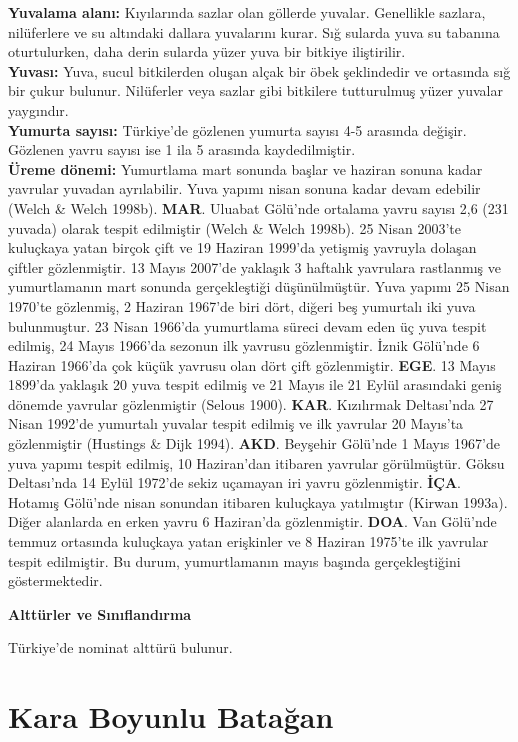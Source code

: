 \documentclass[
  letterpaper,
  DIV=11,
  numbers=noendperiod]{scrreprt}
\begin{document}
\textbf{Yuvalama alanı:} Kıyılarında sazlar olan göllerde yuvalar.
Genellikle sazlara, nilüferlere ve su altındaki dallara yuvalarını
kurar. Sığ sularda yuva su tabanına oturtulurken, daha derin sularda
yüzer yuva bir bitkiye iliştirilir.\\
\textbf{Yuvası:} Yuva, sucul bitkilerden oluşan alçak bir öbek
şeklindedir ve ortasında sığ bir çukur bulunur. Nilüferler veya sazlar
gibi bitkilere tutturulmuş yüzer yuvalar yaygındır.\\
\textbf{Yumurta sayısı:} Türkiye'de gözlenen yumurta sayısı 4-5 arasında
değişir. Gözlenen yavru sayısı ise 1 ila 5 arasında kaydedilmiştir.\\
\textbf{Üreme dönemi:} Yumurtlama mart sonunda başlar ve haziran sonuna
kadar yavrular yuvadan ayrılabilir. Yuva yapımı nisan sonuna kadar devam
edebilir (Welch \& Welch 1998b). \textbf{MAR}. Uluabat Gölü'nde ortalama
yavru sayısı 2,6 (231 yuvada) olarak tespit edilmiştir (Welch \& Welch
1998b). 25 Nisan 2003'te kuluçkaya yatan birçok çift ve 19 Haziran
1999'da yetişmiş yavruyla dolaşan çiftler gözlenmiştir. 13 Mayıs 2007'de
yaklaşık 3 haftalık yavrulara rastlanmış ve yumurtlamanın mart sonunda
gerçekleştiği düşünülmüştür. Yuva yapımı 25 Nisan 1970'te gözlenmiş, 2
Haziran 1967'de biri dört, diğeri beş yumurtalı iki yuva bulunmuştur. 23
Nisan 1966'da yumurtlama süreci devam eden üç yuva tespit edilmiş, 24
Mayıs 1966'da sezonun ilk yavrusu gözlenmiştir. İznik Gölü'nde 6 Haziran
1966'da çok küçük yavrusu olan dört çift gözlenmiştir. \textbf{EGE}. 13
Mayıs 1899'da yaklaşık 20 yuva tespit edilmiş ve 21 Mayıs ile 21 Eylül
arasındaki geniş dönemde yavrular gözlenmiştir (Selous 1900).
\textbf{KAR}. Kızılırmak Deltası'nda 27 Nisan 1992'de yumurtalı yuvalar
tespit edilmiş ve ilk yavrular 20 Mayıs'ta gözlenmiştir (Hustings \&
Dijk 1994). \textbf{AKD}. Beyşehir Gölü'nde 1 Mayıs 1967'de yuva yapımı
tespit edilmiş, 10 Haziran'dan itibaren yavrular görülmüştür. Göksu
Deltası'nda 14 Eylül 1972'de sekiz uçamayan iri yavru gözlenmiştir.
\textbf{İÇA}. Hotamış Gölü'nde nisan sonundan itibaren kuluçkaya
yatılmıştır (Kirwan 1993a). Diğer alanlarda en erken yavru 6 Haziran'da
gözlenmiştir. \textbf{DOA}. Van Gölü'nde temmuz ortasında kuluçkaya
yatan erişkinler ve 8 Haziran 1975'te ilk yavrular tespit edilmiştir. Bu
durum, yumurtlamanın mayıs başında gerçekleştiğini göstermektedir.

\textbf{Alttürler ve Sınıflandırma}

Türkiye'de nominat alttürü bulunur.

\section{Kara Boyunlu Batağan}\label{kara-boyunlu-bataux11fan}
\end{document}
